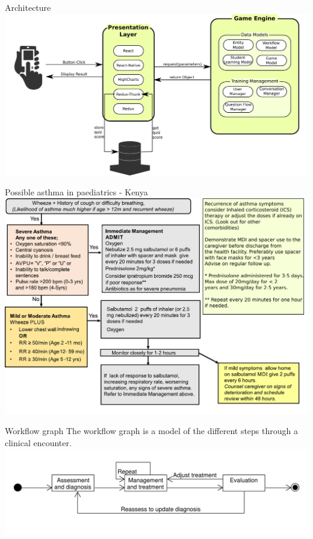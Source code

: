 \documentclass{beamer}
\begin{document}
\begin{frame}{Architecture}
\includegraphics[scale=0.35]{Architecture}
\end{frame}

\begin{frame}{Possible asthma in paediatrics - Kenya}
\includegraphics[scale=0.45]{KenyaCPG}
\end{frame}



\begin{frame}{Workflow graph}
The workflow graph is a model of the different steps through a clinical encounter.
\includegraphics[scale=0.44]{WorkflowGraph}
\end{frame}
\end{document}
